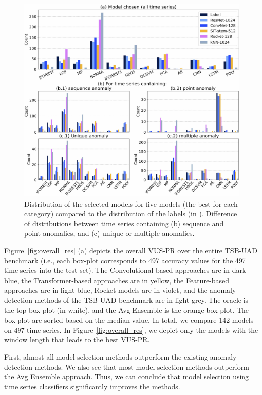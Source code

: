 \begin{figure}
    \centering
    \includegraphics[width=0.94\linewidth]{figures/6_classification_distrib.jpg}
    \vspace{-0.3cm}
    \caption{Distribution of the selected models for five models (the best for each category) compared to the distribution of the labels (in ). Difference of distributions between time series containing (b) sequence and point anomalies, and (c) unique or multiple anomalies.}
    \vspace{-0.3cm}
    \label{fig:classif_distrib}
\end{figure}

Figure~\ref{fig:overall_res} (a) depicts the overall VUS-PR over the entire TSB-UAD benchmark (i.e., each box-plot corresponds to 497 accuracy values for the 497 time series into the test set). The Convolutional-based approaches are in dark blue, the Transformer-based approaches are in yellow, the Feature-based approaches are in light blue, Rocket models are in violet, and the anomaly detection methods of the TSB-UAD benchmark are in light grey. The oracle is the top box plot (in white), and the Avg Ensemble is the orange box plot. The box-plot are sorted based on the median value. In total, we compare 142 models on 497 time series. In Figure~\ref{fig:overall_res}, we depict only the models with the window length that leads to the best VUS-PR.

First, almost all model selection methods outperform the existing anomaly detection methods. We also see that most model selection methods outperform the Avg Ensemble approach. Thus, we can conclude that model selection using time series classifiers significantly improves the  methods. 

